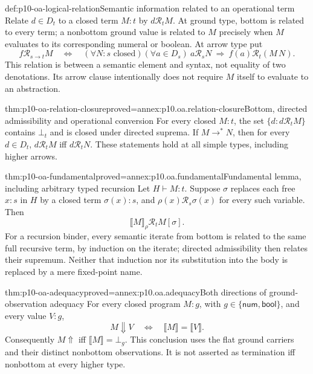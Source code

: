 \begin{hbdefinition}{def:p10-oa-logical-relation}{Semantic information related to an operational term}
Relate \(d\in D_t\) to a closed term \(M:t\) by \(d\mathrel{\mathcal R_t}M\).
At ground type, bottom is related to every term; a nonbottom ground
value is related to \(M\) precisely when \(M\) evaluates to its
corresponding numeral or boolean. At arrow type put
\[
 f\mathrel{\mathcal R_{s\to t}}M\quad\Longleftrightarrow\quad
 (\forall N:s\text{ closed})(\forall a\in D_s)\
 a\mathrel{\mathcal R_s}N\ \Longrightarrow\
 f(a)\mathrel{\mathcal R_t}(M\,N).
\]
This relation is between a semantic element and syntax, not equality
of two denotations. Its arrow clause intentionally does not require
\(M\) itself to evaluate to an abstraction.
\end{hbdefinition}

\begin{hbtheorem}{thm:p10-oa-relation-closure}{proved=annex:p10.oa.relation-closure}{Bottom, directed admissibility and operational conversion}
For every closed \(M:t\), the set
\(\{d:d\mathrel{\mathcal R_t}M\}\) contains \(\bot_t\) and is
closed under directed suprema. If \(M\to^*N\), then for every
\(d\in D_t\),
\(d\mathrel{\mathcal R_t}M\) iff \(d\mathrel{\mathcal R_t}N\).
These statements hold at all simple types, including higher arrows.
\end{hbtheorem}

\begin{hbtheorem}{thm:p10-oa-fundamental}{proved=annex:p10.oa.fundamental}{Fundamental lemma, including arbitrary typed recursion}
Let \(H\vdash M:t\). Suppose \(\sigma\) replaces each free
\(x:s\) in \(H\) by a closed term \(\sigma(x):s\), and
\(\rho(x)\mathrel{\mathcal R_s}\sigma(x)\) for every such variable.
Then
\[
                 \llbracket M\rrbracket_\rho
                       \mathrel{\mathcal R_t}M[\sigma].
\]
For a recursion binder, every semantic iterate from bottom is related
to the same full recursive term, by induction on the iterate; directed
admissibility then relates their supremum. Neither that induction nor
its substitution into the body is replaced by a mere fixed-point name.
\end{hbtheorem}

\begin{hbtheorem}{thm:p10-oa-adequacy}{proved=annex:p10.oa.adequacy}{Both directions of ground-observation adequacy}
For every closed program \(M:g\), with
\(g\in\{\mathsf{num},\mathsf{bool}\}\), and every value \(V:g\),
\[
 M\Downarrow V\quad\Longleftrightarrow\quad
                  \llbracket M\rrbracket=\llbracket V\rrbracket.
\]
Consequently \(M\Uparrow\) iff \(\llbracket M\rrbracket=\bot_g\).
This conclusion uses the flat ground carriers and their distinct
nonbottom observations. It is not asserted as termination iff nonbottom
at every higher type.
\end{hbtheorem}


